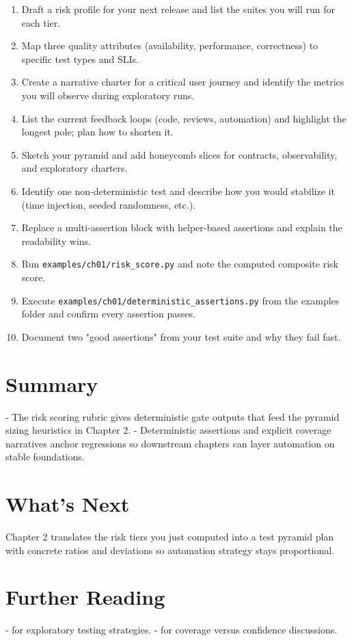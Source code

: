 \begin{enumerate}
  \item Draft a risk profile for your next release and list the suites you will run for each tier.
  \item Map three quality attributes (availability, performance, correctness) to specific test types and SLIs.
  \item Create a narrative charter for a critical user journey and identify the metrics you will observe during exploratory runs.
  \item List the current feedback loops (code, reviews, automation) and highlight the longest pole; plan how to shorten it.
  \item Sketch your pyramid and add honeycomb slices for contracts, observability, and exploratory charters.
  \item Identify one non-deterministic test and describe how you would stabilize it (time injection, seeded randomness, etc.).
  \item Replace a multi-assertion block with helper-based assertions and explain the readability wins.
  \item Run \texttt{examples/ch01/risk\_score.py} and note the computed composite risk score.
  \item Execute \texttt{examples/ch01/deterministic\_assertions.py} from the examples folder and confirm every assertion passes.
  \item Document two "good assertions" from your test suite and why they fail fast.
\end{enumerate}

\section{Summary}
- The risk scoring rubric gives deterministic gate outputs that feed the pyramid sizing heuristics in Chapter 2.
- Deterministic assertions and explicit coverage narratives anchor regressions so downstream chapters can layer automation on stable foundations.

\section{What's Next}
Chapter 2 translates the risk tiers you just computed into a test pyramid plan with concrete ratios and deviations so automation strategy stays proportional.

\section{Further Reading}

- \citep{kaner2002testing} for exploratory testing strategies.
- \citep{myers2011art} for coverage versus confidence discussions.

